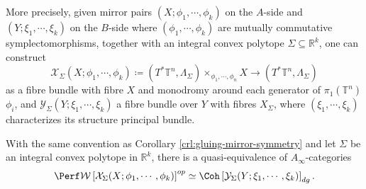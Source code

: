 More precisely, given mirror pairs $(X;\phi_1,\dotsb ,\phi_k)$ on the $A$-side and $(Y;\xi_1,\dotsb, \xi_k)$ on the $B$-side where $(\phi_1,\dotsb ,\phi_k)$ are mutually commutative symplectomorphisms, together with an integral convex polytope $\Sigma\subseteq\mathbb{R}^k$, one can construct \[
    \mathcal{X}_{\Sigma} (X;\phi_1,\dotsb ,\phi_k )\coloneqq\left(T^{\ast}\mathbb{T}^n,\Lambda_{\Sigma}\right)\times_{\phi_1,\dotsb ,\phi_n} X\to (T^{\ast}\mathbb{T}^n,\Lambda_{\Sigma})
\]as a fibre bundle with fibre $X$ and monodromy around each generator of $\pi_1(\mathbb{T}^n)$ $\phi_i$, and $\mathcal{Y}_{\Sigma} (Y;\xi_1,\dotsb ,\xi_k)$ a fibre bundle over $Y$ with fibres $X_{\Sigma}$, where $(\xi_1,\dotsb ,\xi_k)$ characterizes its structure principal bundle.
\begin{crl}\label{crl:toric-bundle-HMS}
    With the same convention as Corollary \ref{crl:gluing-mirror-symmetry} and let $\Sigma$ be an integral convex polytope in $\mathbb{R}^k$, there is a quasi-equivalence of $A_{\infty}$-categories \[
    \Perf\mathcal{W}\left[\mathcal{X}_{\Sigma} (X;\phi_1,\dotsb ,\phi_k)\right]^{op}\simeq\Coh\left[\mathcal{Y}_{\Sigma} (Y;\xi_1,\dotsb ,\xi_k)\right]_{dg}.
    \]
\end{crl}
